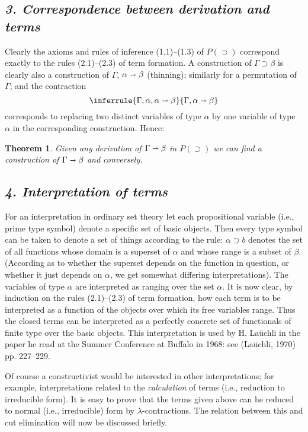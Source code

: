 \documentclass[12pt]{article}
\def\imp{\shortrightarrow}
\def\l{\lambda}
\def\limp{\supset}
\def\PI{P(\limp)}
\def\G{\Gamma}
\def\a{\alpha}
\def\b{\beta}
\def\ab{\a \imp \b}
\newtheorem{theorem}{Theorem}
\begin{document}
\subsection*{\it 3. Correspondence between derivation and terms}

Clearly the axioms and rules of inference (1.1)–(1.3) of $\PI$ correspond exactly to the rules 
(2.1)–(2.3) of term formation. A construction of $\G \limp \b$ is clearly also a construction of $\G$, $\ab$
(thinning); similarly for a permutation of $\G$; and the contraction
$$
\inferrule{\G, \a, \ab}{\G, \ab}
$$
corresponds to replacing two distinct variables of type $\a$
by one variable of type $\a$ in the corresponding construction. Hence:
\begin{theorem}
Given any derivation of $\G \imp \b$ in $\PI$ we can find a construction of $\G \imp \b$ and conversely.
\end{theorem}

\subsection*{\it 4. Interpretation of terms}

\def\fxg{[F^\a/X^\a]G^\b}

For an interpretation in ordinary set theory let each propositional variable (i.e., prime type symbol) denote a specific set of basic
objects. Then every type symbol can be taken to denote a set of things according to the rule: $\a \limp b$ 
denotes the set of all functions whose domain is a superset of $\a$ and whose range is a subset of $\b$. (According as to whether the superset depends on the function in question, or whether it just depends on $\a$, we get somewhat differing interpretations). 
The variables of type $\a$ are interpreted as ranging over the set $\a$. It is now clear, by induction on the rules (2.1)–(2.3) of term formation, how each term is to be interpreted as a function of the objects over which its free variables range. Thus the closed terms can be interpreted as a perfectly concrete set of functionals of finite type over the basic objects. This interpretation is used by H. Laüchli in the paper he read at the Summer Conference at Buffalo in 1968: see (Laüchli, 1970) pp. 227–229.

Of course a constructivist would be interested in other interpretations; for example, interpretations related to the {\it calculation}
of terms (i.e., reduction to irreducible form). It is easy to prove that the terms given above can he reduced to normal 
(i.e., irreducible) form by $\l$-contractions. The relation between this and cut elimination will now be discussed briefly.
\end{document}
